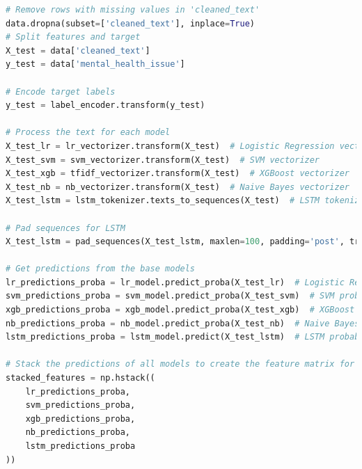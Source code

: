 \begin{tcolorbox}[colback=gray!5!white, colframe=gray!80!black, boxrule=0.5pt, title=Evaluate Meta-Learner and Ensemble Model 2]
    \begin{lstlisting}[language=Python]
# Remove rows with missing values in 'cleaned_text'
data.dropna(subset=['cleaned_text'], inplace=True)
# Split features and target
X_test = data['cleaned_text']
y_test = data['mental_health_issue']

# Encode target labels
y_test = label_encoder.transform(y_test)

# Process the text for each model
X_test_lr = lr_vectorizer.transform(X_test)  # Logistic Regression vectorizer
X_test_svm = svm_vectorizer.transform(X_test)  # SVM vectorizer
X_test_xgb = tfidf_vectorizer.transform(X_test)  # XGBoost vectorizer
X_test_nb = nb_vectorizer.transform(X_test)  # Naive Bayes vectorizer
X_test_lstm = lstm_tokenizer.texts_to_sequences(X_test)  # LSTM tokenizer

# Pad sequences for LSTM
X_test_lstm = pad_sequences(X_test_lstm, maxlen=100, padding='post', truncating='post')

# Get predictions from the base models
lr_predictions_proba = lr_model.predict_proba(X_test_lr)  # Logistic Regression probabilities
svm_predictions_proba = svm_model.predict_proba(X_test_svm)  # SVM probabilities
xgb_predictions_proba = xgb_model.predict_proba(X_test_xgb)  # XGBoost probabilities
nb_predictions_proba = nb_model.predict_proba(X_test_nb)  # Naive Bayes probabilities
lstm_predictions_proba = lstm_model.predict(X_test_lstm)  # LSTM probabilities

# Stack the predictions of all models to create the feature matrix for the meta-learner
stacked_features = np.hstack((
    lr_predictions_proba,
    svm_predictions_proba,
    xgb_predictions_proba,
    nb_predictions_proba,
    lstm_predictions_proba
))

\end{lstlisting}
\end{tcolorbox}

